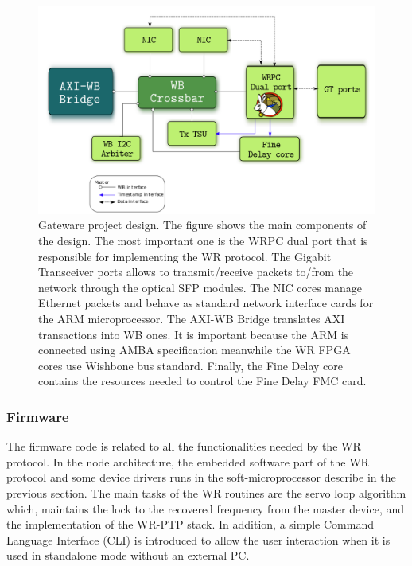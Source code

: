 \begin{figure}[H]
	\centering
	\includegraphics[scale=0.4]{img/gateware_first_level}
	\caption{Gateware project design. The figure shows the main components of the design. The most important one is the WRPC dual port that is responsible for implementing the WR protocol. The Gigabit Transceiver ports allows to transmit/receive packets to/from the network through the optical SFP modules. The NIC cores manage Ethernet packets and behave as standard network interface cards for the ARM microprocessor. The AXI-WB Bridge translates AXI transactions into WB ones. It is important because the ARM is connected using AMBA specification meanwhile the WR FPGA cores use Wishbone bus standard. Finally, the Fine Delay core contains the resources needed to control the Fine Delay FMC card.}
	\label{fig:gateware_first_level}
\end{figure}

\subsubsection{Firmware} \label{subsec:firmware}

The firmware code is related to all the functionalities needed by the WR protocol. In the node architecture, the embedded software part of the WR 
protocol and some device drivers runs in the soft-microprocessor describe in 
the previous section. The main tasks of the WR routines are the servo 
loop algorithm which, maintains the lock to the recovered frequency from the 
master device, and the implementation of the WR-PTP stack. In addition, a 
simple Command Language Interface (CLI) is introduced to allow 
the user interaction when it is used in standalone mode without an external PC.

